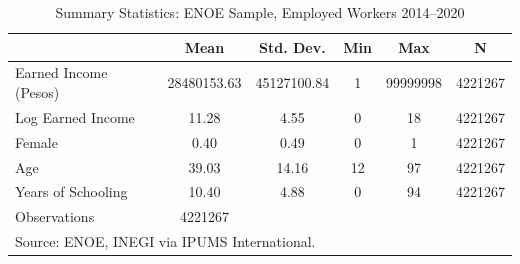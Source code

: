 \begin{table}[htbp]\centering
\def\sym#1{\ifmmode^{#1}\else\(^{#1}\)\fi}
\caption{Summary Statistics: ENOE Sample, Employed Workers 2014--2020}
\begin{tabular}{l*{1}{ccccc}}
\hline\hline
                    &        Mean&   Std. Dev.&         Min&         Max&           N\\
\hline
Earned Income (Pesos)& 28480153.63& 45127100.84&           1&    99999998&     4221267\\
Log Earned Income   &       11.28&        4.55&           0&          18&     4221267\\
Female              &        0.40&        0.49&           0&           1&     4221267\\
Age                 &       39.03&       14.16&          12&          97&     4221267\\
Years of Schooling  &       10.40&        4.88&           0&          94&     4221267\\
\hline
Observations        &     4221267&            &            &            &            \\
\hline\hline
\multicolumn{6}{l}{\footnotesize Source: ENOE, INEGI via IPUMS International.}\\
\end{tabular}
\end{table}
